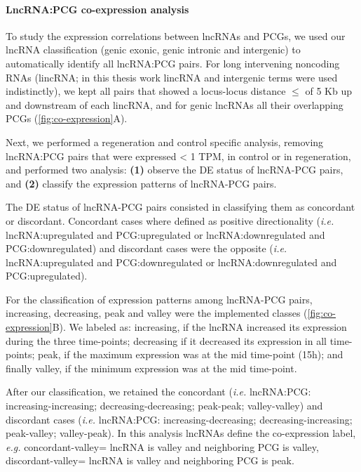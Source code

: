 \paragraph{LncRNA:PCG co-expression analysis}
\label{sec:lncRNA_pc_co-expression}

To study the expression correlations between lncRNAs and PCGs, we used our lncRNA classification (genic exonic, genic intronic and intergenic) to automatically identify all lncRNA:PCG pairs. For long intervening noncoding RNAs (lincRNA; in this thesis work lincRNA and intergenic terms were used indistinctly), we kept all pairs that showed a locus-locus distance $\leq$ of 5 Kb up and downstream of each lincRNA, and for genic lncRNAs all their overlapping PCGs (\autoref{fig:co-expression}A).

Next, we performed a regeneration and control specific analysis, removing lncRNA:PCG pairs that were expressed < 1 TPM, in control or in regeneration, and performed two analysis: \textbf{(1)} observe the DE status of lncRNA-PCG pairs, and \textbf{(2)} classify the expression patterns of lncRNA-PCG pairs.

The DE status of lncRNA-PCG pairs consisted in classifying them as concordant or discordant. Concordant cases where defined as positive directionality (\textit{i.e.} lncRNA:upregulated and PCG:upregulated or lncRNA:downregulated and PCG:downregulated) and discordant cases were the opposite (\textit{i.e.} lncRNA:upregulated and PCG:downregulated or lncRNA:downregulated and PCG:upregulated).

For the classification of expression patterns among lncRNA-PCG pairs, increasing, decreasing, peak and valley were the implemented classes (\autoref{fig:co-expression}B). We labeled as: increasing, if the lncRNA increased its expression during the three time-points; decreasing if it decreased its expression in all time-points; peak, if the maximum expression was at the mid time-point (15h); and finally valley, if the minimum expression was at the mid time-point. 

After our classification, we retained the concordant (\textit{i.e.} lncRNA:PCG: increasing-increasing; decreasing-decreasing; peak-peak; valley-valley) and discordant cases (\textit{i.e.} lncRNA:PCG: increasing-decreasing; decreasing-increasing; peak-valley; valley-peak). In this analysis lncRNAs define the co-expression label, \textit{e.g.} concordant-valley= lncRNA is valley and neighboring PCG is valley, discordant-valley= lncRNA is valley and neighboring PCG is peak. 

